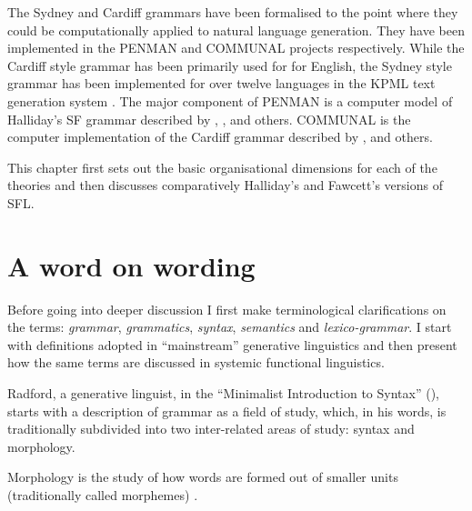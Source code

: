 The Sydney and Cardiff grammars have been formalised to the point where they could be computationally applied to natural language generation. They have been implemented in the PENMAN \citep{PenmanOverview,Penman89} and COMMUNAL \citep{Fawcett90-communal} projects respectively. While the Cardiff style grammar has been primarily used for for English, the Sydney style grammar has been implemented for over twelve languages in the KPML text generation system \citep{KPML1,Bateman96-KPML-resources,Bateman1997}. The major component of PENMAN is a computer model of Halliday's SF grammar described by \citet{gazebo}, \citet{MatthiessenBateman91}, \citet{Matthiessen95-all} and others. COMMUNAL is the computer implementation of the Cardiff grammar described by \citet{Fawcett:1988}, \citet{Fawcett93-ewnlg4} and others. 

This chapter first sets out the basic organisational dimensions for each of the theories and then discusses comparatively Halliday's \citep{Halliday2002} and Fawcett's \citep{Fawcett2000} versions of SFL.


\section{A word on wording}
\label{sec:wording}
Before going into deeper discussion I first make terminological clarifications on the terms: \textit{grammar}, \textit{grammatics}, \textit{syntax}, \textit{semantics} and \textit{lexico-grammar}. I start with definitions adopted in ``mainstream'' generative linguistics and then present how the same terms are discussed in systemic functional linguistics.

Radford, a generative linguist, in the ``Minimalist Introduction to Syntax'' (\citeyear{Radford1997}), starts with a description of grammar as a field of study, which, in his words, is traditionally subdivided into two inter-related areas of study: syntax and morphology. %

\begin{definition}\label{def:morphology-min}
Morphology is the study of how words are formed out of smaller units (traditionally called morphemes) \citep[1]{Radford1997}.
\end{definition}

